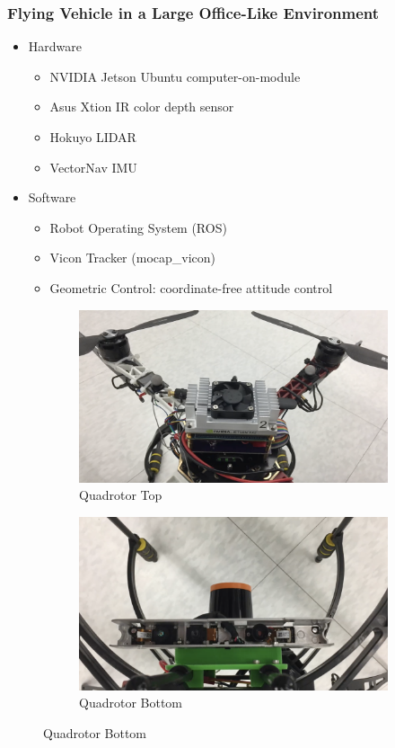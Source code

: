 \documentclass[11pt,professionalfonts,hyperref={pdftex,pdfpagemode=none,pdfstartview=FitH}]{beamer}
\begin{document}
\begin{frame}
\frametitle{Flying Vehicle in a Large Office-Like Environment}
\begin{itemize}
        	\item Hardware
	\begin{itemize}
		\item NVIDIA Jetson Ubuntu computer-on-module
		\item Asus Xtion IR color depth sensor
		\item Hokuyo LIDAR
		\item VectorNav IMU
	\end{itemize}
	\item Software
	\begin{itemize}
		\item Robot Operating System (ROS)
		\item Vicon Tracker (mocap\_vicon)
		\item Geometric Control: coordinate-free attitude control
	\end{itemize}
\end{itemize}
\begin{figure}
  \centering
  \begin{subfigure}[t]{.4\linewidth}
    \centering\includegraphics[height=.5\linewidth]{quad_top.png}
    \caption*{Quadrotor Top}
  \end{subfigure}
  \begin{subfigure}[t]{.4\linewidth}
    \centering\includegraphics[height=.5\linewidth]{quad_bottom.png}
    \caption*{Quadrotor Bottom}
  \end{subfigure}
\end{figure}
\end{frame}
\end{document}
